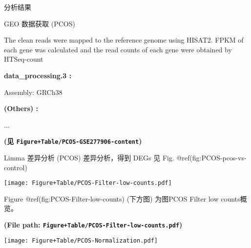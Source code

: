 \documentclass[
  ignorenonframetext,
]{beamer}
\begin{document}
\begin{frame}[fragile]{分析结果}
\begin{block}{GEO 数据获取 (PCOS)}
\begin{center}
\begin{tcolorbox}[colback=gray!10, colframe=gray!50, width=0.9\linewidth, arc=1mm, boxrule=0.5pt]
    The clean reads were mapped to the reference genome
using HISAT2. FPKM of each gene was calculated and the read
counts of each gene were obtained by HTSeq-count

\vspace{2em}


\textbf{
data\_processing.3
:}

\vspace{0.5em}

    Assembly: GRCh38

\vspace{2em}


\textbf{
(Others)
:}

\vspace{0.5em}

    ...

\vspace{2em}
\end{tcolorbox}
\end{center}

\textbf{(见 \texttt{Figure+Table/PCOS-GSE277906-content})}
\end{block}

\begin{block}{Limma 差异分析 (PCOS)}
\protect\hypertarget{limma-ux5deeux5f02ux5206ux6790-pcos}{}
差异分析，得到 DEGs 见 Fig. @ref(fig:PCOS-pcos-vs-control)

\begin{center}\vspace{1.5cm}\end{center}
\def\@captype{figure}
\begin{center}
\texttt{[image: Figure+Table/PCOS-Filter-low-counts.pdf]}
\caption{PCOS Filter low counts}\label{fig:PCOS-Filter-low-counts}
\end{center}

Figure @ref(fig:PCOS-Filter-low-counts) (下方图) 为图PCOS Filter low
counts概览。

\textbf{(File path: \texttt{Figure+Table/PCOS-Filter-low-counts.pdf})}

\begin{center}\vspace{1.5cm}\end{center}

\begin{center}\vspace{1.5cm}\end{center}
\def\@captype{figure}
\begin{center}
\texttt{[image: Figure+Table/PCOS-Normalization.pdf]}
\caption{PCOS Normalization}\label{fig:PCOS-Normalization}
\end{center}


\end{block}
\end{frame}
\end{document}
